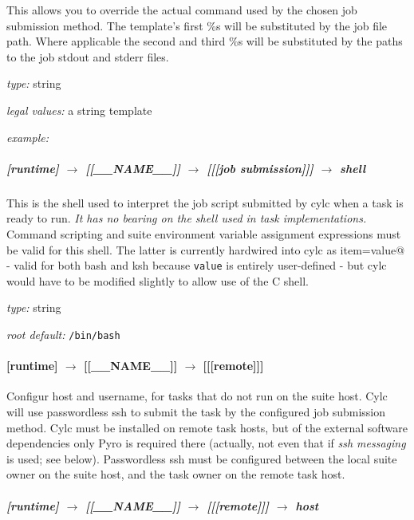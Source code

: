 This allows you to override the actual command used by the chosen job
submission method. The template's first \%s will be substituted by the
job file path.  Where applicable the second and third \%s will be
substituted by the paths to the job stdout and stderr files.

\begin{myitemize}
\item {\em type:} string
\item {\em legal values:} a string template
\item {\em example:} \lstinline@llsubmit %s@
\end{myitemize}

\subparagraph[shell]{[runtime] $\rightarrow$ [[\_\_NAME\_\_]] $\rightarrow$ [[[job submission]]] $\rightarrow$ shell}
\label{JobSubShell}

This is the shell used to interpret the job script submitted by cylc
when a task is ready to run.  {\em It has no bearing on the shell used
in task implementations.} Command scripting and suite environment 
variable assignment expressions must be valid for this shell. The 
latter is currently hardwired into cylc as 
\lstinline@export item=value@ - valid for both bash and ksh
because \lstinline=value= is entirely user-defined - but cylc would have
to be modified slightly to allow use of the C shell.

\begin{myitemize}
\item {\em type:} string
\item {\em root default:} \lstinline=/bin/bash= 
\end{myitemize}


\paragraph[{[[[}remote{]]]}]{[runtime] $\rightarrow$ [[\_\_NAME\_\_]] $\rightarrow$ [[[remote]]]}

Configur host and username, for tasks that do not run on the suite host.
Cylc will use passwordless ssh to submit the task by the configured
job submission method. Cylc must be installed on remote task hosts, but
of the external software dependencies only Pyro is required there
(actually, not even that if {\em ssh messaging} is used; see below).
Passwordless ssh must be configured between the local suite owner on the
suite host, and the task owner on the remote task host.

\subparagraph[host]{[runtime] $\rightarrow$ [[\_\_NAME\_\_]] $\rightarrow$ [[[remote]]] $\rightarrow$ host}
\label{DynamicHostSelection}

